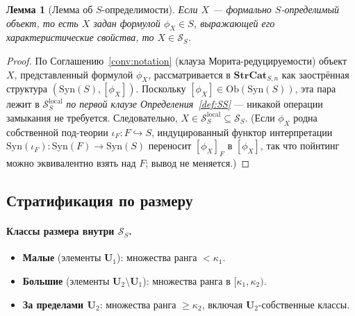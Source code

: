 \documentclass[11pt]{article}
\theoremstyle{plain}
\newtheorem{lemma}[theorem]{Лемма}
\theoremstyle{definition}
\newcommand{\cS}{\mathcal{S}}
\newcommand{\Ob}{\mathrm{Ob}}
\newcommand{\Syn}{\mathrm{Syn}}
\begin{document}
\begin{lemma}[Лемма об $S$-определимости]\label{lem:SS-membership}
Если $X$ — формально $S$-определимый объект, то есть $X$ задан формулой $\phi_X \in S$, выражающей его характеристические свойства, то $X \in \cS_S$.
\end{lemma}

\begin{proof}
По Соглашению~\ref{conv:notation} (клауза Морита-редуцируемости) объект $X$, представленный формулой $\phi_X$, рассматривается в $\mathbf{StrCat}_{S, n}$ как заострённая структура $(\Syn(S), [\phi_X])$. Поскольку $[\phi_X] \in \Ob(\Syn(S))$, эта пара лежит в $\cS_S^{\mathrm{local}}$ \emph{по первой клаузе Определения~\ref{def:SS}} --- никакой операции замыкания не требуется. Следовательно, $X \in \cS_S^{\mathrm{local}} \subseteq \cS_S$. (Если $\phi_X$ родна собственной под-теории $\iota_F : F \hookrightarrow S$, индуцированный функтор интерпретации $\Syn(\iota_F) : \Syn(F) \to \Syn(S)$ переносит $[\phi_X]_F$ в $[\phi_X]$, так что пойнтинг можно эквивалентно взять над $F$; вывод не меняется.)
\end{proof}

\subsection{Стратификация по размеру}\label{sec:size-stratification}

\paragraph{Классы размера внутри $\cS_S$.}
\begin{itemize}
\item \textbf{Малые} (элементы $\mathbf{U}_1$): множества ранга $< \kappa_1$.
\item \textbf{Большие} (элементы $\mathbf{U}_2 \setminus \mathbf{U}_1$): множества ранга в $[\kappa_1, \kappa_2)$.
\item \textbf{За пределами $\mathbf{U}_2$}: множества ранга $\geq \kappa_2$, включая $\mathbf{U}_2$-собственные классы.
\end{itemize}
\end{document}
